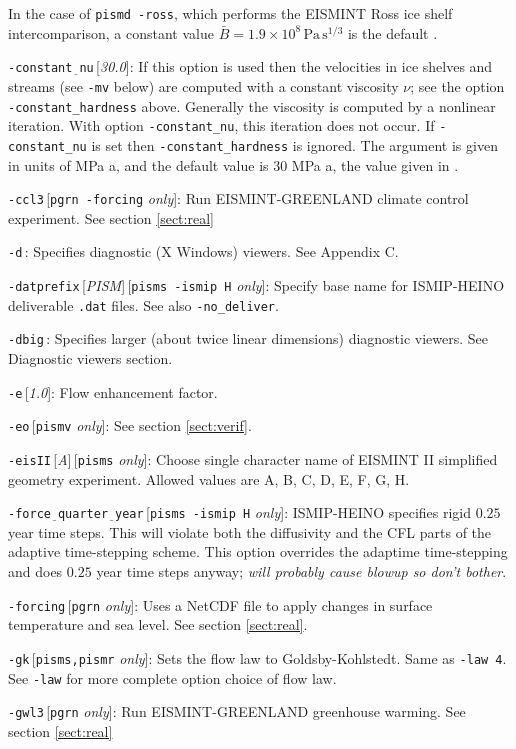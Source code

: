 \documentclass[11pt,final]{amsart}
\newcommand{\rawopt}[1]{\vspace{1mm}\noindent \Large\texttt{-#1}\normalsize}
\newcommand{\opt}[1]{\rawopt{#1}\,:\quad}
\newcommand{\optdef}[2]{\rawopt{#1}\,[\textsl{#2}]:\quad}
\newcommand{\optrestrict}[2]{\rawopt{#1}\,[\texttt{#2} \textsl{only}]:\quad}
\newcommand{\optdefrestrict}[3]{\rawopt{#1}\,[\textsl{#2}]\,[\texttt{#3} \textsl{only}]:\quad}
\newcommand{\und}{$\underline{\,\,\,}$}
\begin{document}
In the case of \verb|pismd -ross|, which performs the EISMINT Ross ice shelf intercomparison, a constant value $\bar B = 1.9 \times 10^8 \, \text{Pa}\, \text{s}^{1/3}$ is the default \cite{MacAyealetal}.

\optdef{constant\und nu}{30.0}  If this option is used then the velocities in ice shelves and streams (see \verb|-mv| below) are computed with a constant viscosity $\nu$; see the option \verb|-constant_hardness| above.  Generally the viscosity is computed by a nonlinear iteration.  With option \verb|-constant_nu|, this iteration does not occur.  If \verb|-constant_nu| is set then \verb|-constant_hardness| is ignored.  The argument is given in units of MPa a, and the default value is $30$ MPa a, the value given in \cite{Ritzetal2001}.

\optrestrict{ccl3}{pgrn -forcing}    Run EISMINT-GREENLAND climate control experiment. See section \ref{sect:real}

\opt{d}  Specifies diagnostic (X Windows) viewers.  See Appendix C.

\optdefrestrict{datprefix}{PISM}{pisms -ismip H}  Specify base name for ISMIP-HEINO deliverable \verb|.dat| files.  See also \verb|-no_deliver|.

\opt{dbig}  Specifies larger (about twice linear dimensions) diagnostic viewers.  See Diagnostic viewers section.

\optdef{e}{1.0}  Flow enhancement factor.

\optrestrict{eo}{pismv}  See section \ref{sect:verif}.

\optdefrestrict{eisII}{A}{pisms}  Choose single character name of EISMINT II \cite{EISMINT00} simplified geometry experiment.  Allowed values are A, B, C, D, E, F, G, H.

\optrestrict{force\und quarter\und year}{pisms -ismip H}  ISMIP-HEINO specifies rigid $0.25$ year time steps.  This will violate both the diffusivity and the CFL parts of the adaptive time-stepping scheme.  This option overrides the adaptime time-stepping and does $0.25$ year time steps anyway; \emph{will probably cause blowup so don't bother}.

\optrestrict{forcing}{pgrn}    Uses a NetCDF file to apply changes in surface temperature and sea level. See section \ref{sect:real}.

\optrestrict{gk}{pisms,pismr}  Sets the flow law to Goldsby-Kohlstedt.  Same as \verb|-law 4|.  See \verb|-law| for more complete option choice of flow law.

\optrestrict{gwl3}{pgrn}    Run EISMINT-GREENLAND greenhouse warming. See section \ref{sect:real}
\end{document}
